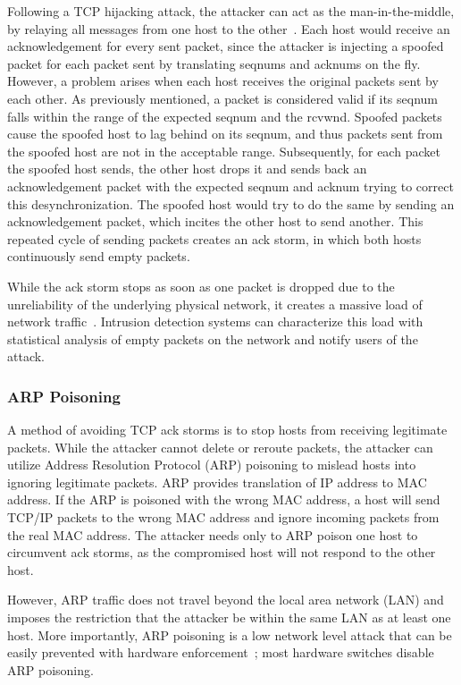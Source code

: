 \documentclass{sig-alternate}
\begin{document}
Following a TCP hijacking attack, the attacker can act as the man-in-the-middle, by relaying all messages from one host to the other~\cite{joncheray:simpleattack, gregg:stackhack}. Each host would receive an acknowledgement for every sent packet, since the attacker is injecting a spoofed packet for each packet sent by translating seqnums and acknums on the fly. However, a problem arises when each host receives the original packets sent by each other. As previously mentioned, a packet is considered valid if its seqnum falls within the range of the expected seqnum and the rcvwnd. Spoofed packets cause the spoofed host to lag behind on its seqnum, and thus packets sent from the spoofed host are not in the acceptable range. Subsequently, for each packet the spoofed host sends, the other host drops it and sends back an acknowledgement packet with the expected seqnum and acknum trying to correct this desynchronization. The spoofed host would try to do the same by sending an acknowledgement packet, which incites the other host to send another. This repeated cycle of sending packets creates an ack storm, in which both hosts continuously send empty packets.

While the ack storm stops as soon as one packet is dropped due to the unreliability of the underlying physical network, it creates a massive load of network traffic~\cite{joncheray:simpleattack}. Intrusion detection systems can characterize this load with statistical analysis of empty packets on the network and notify users of the attack.

\subsubsection{ARP Poisoning}

A method of avoiding TCP ack storms is to stop hosts from receiving legitimate packets. While the attacker cannot delete or reroute packets, the attacker can utilize Address Resolution Protocol (ARP) poisoning to mislead hosts into ignoring legitimate packets. ARP provides translation of IP address to MAC address. If the ARP is poisoned with the wrong MAC address, a host will send TCP/IP packets to the wrong MAC address and ignore incoming packets from the real MAC address.
The attacker needs only to ARP poison one host to circumvent ack storms, as the compromised host will not respond to the other host.

However, ARP traffic does not travel beyond the local area network (LAN) and imposes the restriction that the attacker be within the same LAN as at least one host. More importantly, ARP poisoning is a low network level attack that can be easily prevented with hardware enforcement~\cite{spangler:sniffing}; most hardware switches disable ARP poisoning.
\end{document}
